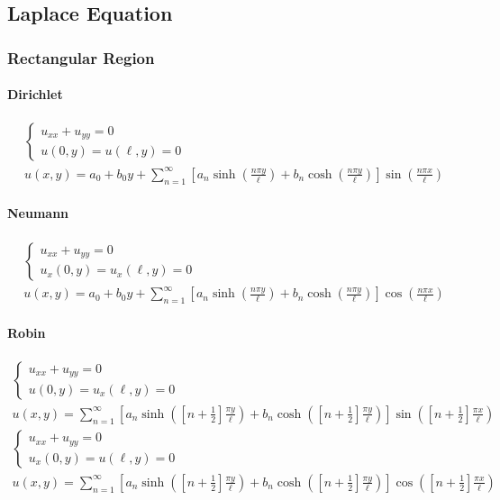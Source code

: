 \documentclass{article}
\begin{document}
\subsection{Laplace Equation}
\subsubsection*{Rectangular Region}
\paragraph{Dirichlet}
\begin{gather*}
\begin{cases}
u_{xx} + u_{yy} = 0\\
u(0,y) = u(\ell,y) = 0
\end{cases}\\
u(x,y) = a_{0} + b_{0}y + \sum_{n=1}^{\infty}\left[a_{n}\sinh{\left(\frac{n\pi y}{\ell}\right)} + b_{n}\cosh{\left(\frac{n\pi y}{\ell}\right)}\right]\sin{\left(\frac{n\pi x}{\ell}\right)}
\end{gather*}

\paragraph{Neumann}
\begin{gather*}
\begin{cases}
u_{xx} + u_{yy} = 0\\
u_{x}(0,y) = u_{x}(\ell,y) = 0
\end{cases}\\
u(x,y) = a_{0} + b_{0}y + \sum_{n=1}^{\infty}\left[a_{n}\sinh{\left(\frac{n\pi y}{\ell}\right)} + b_{n}\cosh{\left(\frac{n\pi y}{\ell}\right)}\right]\cos{\left(\frac{n\pi x}{\ell}\right)}
\end{gather*}

\paragraph{Robin}
\begin{gather*}
\begin{cases}
u_{xx} + u_{yy} = 0\\
u(0,y) = u_{x}(\ell,y) = 0
\end{cases}\\
u(x,y) = \sum_{n=1}^{\infty}\left[a_{n}\sinh{\left(\left[n + \frac{1}{2}\right]\frac{\pi y}{\ell}\right)} + b_{n}\cosh{\left(\left[n + \frac{1}{2}\right]\frac{\pi y}{\ell}\right)}\right]\sin{\left(\left[n + \frac{1}{2}\right]\frac{\pi x}{\ell}\right)}
\end{gather*}
\begin{gather*}
\begin{cases}
u_{xx} + u_{yy} = 0\\
u_{x}(0,y) = u(\ell,y) = 0
\end{cases}\\
u(x,y) = \sum_{n=1}^{\infty}\left[a_{n}\sinh{\left(\left[n + \frac{1}{2}\right]\frac{\pi y}{\ell}\right)} + b_{n}\cosh{\left(\left[n + \frac{1}{2}\right]\frac{\pi y}{\ell}\right)}\right]\cos{\left(\left[n + \frac{1}{2}\right]\frac{\pi x}{\ell}\right)}
\end{gather*}
\end{document}
